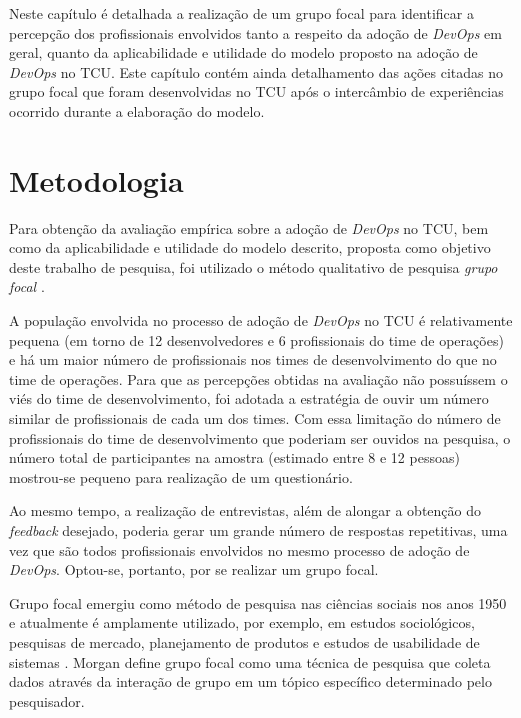 Neste capítulo é detalhada a realização de um grupo focal \cite{focus_group_handbook,shull2007guide}
para identificar a percepção dos profissionais envolvidos tanto a respeito da
adoção de {\it DevOps} em geral, quanto da aplicabilidade e utilidade do modelo
proposto na adoção de {\it DevOps} no \acrshort{TCU}. Este capítulo contém ainda
detalhamento das ações citadas no grupo focal que foram desenvolvidas no \acrshort{TCU}
após o intercâmbio de experiências ocorrido durante a elaboração do modelo.

\section{Metodologia}

Para obtenção da avaliação empírica sobre a adoção de {\it DevOps} no \acrshort{TCU},
bem como da aplicabilidade e utilidade do modelo descrito, proposta como
objetivo deste trabalho de pesquisa, foi utilizado o método qualitativo de
pesquisa \emph{grupo focal} \cite{focus_group_handbook}.

A população envolvida no processo de adoção de \textit{DevOps} no TCU é
relativamente pequena (em torno de 12 desenvolvedores e 6 profissionais do time
de operações) e há um maior número de profissionais nos times de
desenvolvimento do que no time de operações. Para que as percepções obtidas
na avaliação não possuíssem o viés do time de desenvolvimento, foi adotada a
estratégia de ouvir um número similar de profissionais de cada um dos times.
Com essa limitação do número de profissionais do time de desenvolvimento que
poderiam ser ouvidos na pesquisa, o número total de participantes na amostra
(estimado entre 8 e 12 pessoas) mostrou-se pequeno para realização de um
questionário.

Ao mesmo tempo, a realização de entrevistas, além de alongar a obtenção do
\textit{feedback} desejado, poderia gerar um grande número de respostas
repetitivas, uma vez que são todos profissionais envolvidos no mesmo processo
de adoção de \textit{DevOps}. Optou-se, portanto, por se realizar um grupo
focal.

Grupo focal emergiu como método de pesquisa nas ciências sociais nos anos 1950
e atualmente é amplamente utilizado, por exemplo, em estudos sociológicos,
pesquisas de mercado, planejamento de produtos e estudos de usabilidade de
sistemas \cite{shull2007guide}. Morgan \cite{morgan1996focus} define grupo focal
como uma técnica de pesquisa que coleta dados através da interação de grupo em
um tópico específico determinado pelo pesquisador.


